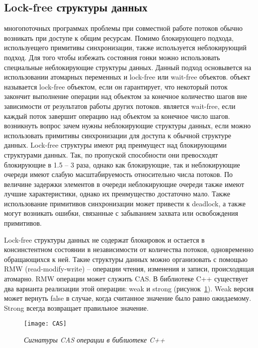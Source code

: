 { %
	\subsection{Lock-free структуры данных}
	\label{lockfree:section}
	 многопоточных программах проблемы при совместной работе потоков обычно возникать при доступе к общим ресурсам. Помимо блокирующего подхода, используещего примитивы синхронизации, также используется неблокирующий подход. Для того чтобы избежать состояния гонки можно использовать специальные неблокирующие структуры данных. Данный подход основывется на использовании атомарных переменных и lock-free или wait-free объектов.
	 объект называется lock-free объектом, если он гарантирует, что некоторый поток закончит выполнение операции над объектом за конечное количество шагов вне зависимости от результатов работы других потоков.
	 является wait-free, если каждый поток завершит операцию над объектом за конечное число шагов.
	 возникнуть вопрос зачем нужны неблокирующие структуры данных, если можно использовать примитивы синхронизации для доступа к обычной структуре данных. Lock-free структуры имеют ряд преимущест над блокирующими структурами данных. Так, по пропуской способности они превосходят блокирующие в 1.5 -- 3 раза, однако как блокирующие, так и неблокирующие очереди имеют слабую масштабируемость относительно числа потоков. По величине задержки элементов в очереди неблокирующие очереди также имеют лучшие характеристики, однако их преимущество достаточно мало. Также использование примитивов синхронизации может привести к deadlock, а также могут возникать ошибки, связанные с забыванием захвата или освобождения примитивов.
	\par Lock-free структуры данных не содержат блокировок и остается в консинстентном состоянии в независимости от количества потоков, одновременно обращающихся к ней. Такие структуры данных можно организовать с помощью RMW (read-modify-write) -- операции чтения, изменения и записи, происходящая атомарно.
	 RMW операции может служить CAS. В библиотеке C++ существует два варианта реализации этой операции: weak и strong (рисунок~\ref{CAS:image}). Weak версия может вернуть false в случае, когда считанное значение было равно ожидаемому. Strong всегда возвращает правильное значение.
	\begin{figure}[H]
		\texttt{[image: CAS]}
		\caption{\textit{Сигнатуры CAS операции в библиотеке C++}}
		\label{CAS:image}
	\end{figure}
}
